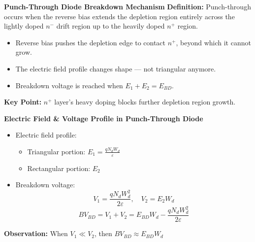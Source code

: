 \begin{frame}{\textbf{Punch-Through Diode Breakdown Mechanism}}
    \textbf{Definition:} Punch-through occurs when the reverse bias extends the depletion region entirely across the lightly doped $n^-$ drift region up to the heavily doped $n^+$ region.
    \begin{itemize}
        \item Reverse bias pushes the depletion edge to contact $n^+$, beyond which it cannot grow.
        \item The electric field profile changes shape — not triangular anymore.
        \item Breakdown voltage is reached when $E_1 + E_2 = E_{BD}$.
    \end{itemize}
    \vspace{1em}
    \textbf{Key Point:} $n^+$ layer's heavy doping blocks further depletion region growth.
\end{frame}

\begin{frame}{\textbf{Electric Field \& Voltage Profile in Punch-Through Diode}}
    \begin{itemize}
        \item Electric field profile:
        \begin{itemize}
            \item Triangular portion: $E_1 = \frac{qN_dW_d}{\varepsilon}$
            \item Rectangular portion: $E_2$
        \end{itemize}
        \item Breakdown voltage:
        \begin{equation}
            V_1 = \frac{qN_dW_d^2}{2\varepsilon}, \quad V_2 = E_2 W_d
        \end{equation}
        \begin{equation}
            BV_{BD} = V_1 + V_2 = E_{BD}W_d - \frac{qN_dW_d^2}{2\varepsilon}
        \end{equation}
    \end{itemize}
    \textbf{Observation:} When $V_1 \ll V_2$, then $BV_{BD} \approx E_{BD}W_d$
\end{frame}

